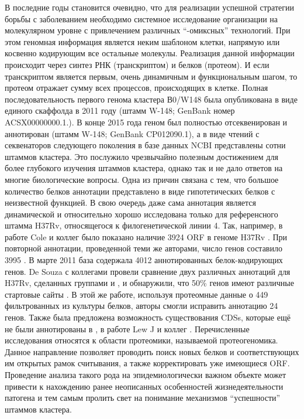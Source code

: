 В последние годы становится очевидно, что для реализации успешной стратегии борьбы с заболеванием необходимо системное исследование организации  на молекулярном уровне с привлечением различных “-омиксных” технологий. При этом геномная информация является неким шаблоном клетки, напрямую или косвенно кодирующим все остальные молекулы. Реализация данной информации происходит через синтез РНК (транскриптом) и белков (протеом). И если транскриптом является первым, очень динамичным и функциональным шагом, то протеом отражает сумму всех процессов, происходящих в клетке. Полная последовательность первого генома  кластера В0/W148 была опубликована в виде единого скаффолда в 2011 году (штамм W-148; GenBank номер ACSX00000000.1.). В конце 2015 года геном был полностью отсеквенирован и аннотирован (штамм W-148; GenBank CP012090.1), а в виде чтений с секвенаторов следующего поколения в базе данных NCBI представлены сотни штаммов кластера. Это послужило чрезвычайно полезным достижением для более глубокого изучения штаммов кластера, однако так и не дало ответов на многие биологические вопросы. Одна из причин связана с тем, что большое количество белков аннотации представлено в виде гипотетических белков с неизвестной функцией. В свою очередь даже сама аннотация является динамической и относительно хорошо исследована только для референсного штамма H37Rv, относящегося к филогенетической линии 4.  Так, например, в работе Cole и коллег было показано наличие 3924 ORF в геноме H37Rv \cite{cole1998erratum}. При повторной аннотации, проведенной теми же авторами, число генов составило 3995 \cite{camus2002re}. В марте 2011 база  содержала 4012 аннотированных белок-кодирующих генов. De Souza с коллегами провели сравнение двух различных аннотаций для H37Rv, сделанных группами  и , и обнаружили, что 50\% генов имеют различные стартовые сайты \cite{de2008high}. В этой же работе, используя протеомные данные о 449 фильтрованных из культуры белков, авторы смогли исправить аннотацию 24 генов. Также была предложена возможность существования CDSs, которые ещё не были аннотированы в , в работе Lew J и коллег \cite{lew2011tuberculist}.
Перечисленные исследования относятся к области протеомики, называемой протеогеномика. Данное направление позволяет проводить поиск новых белков и соответствующих им открытых рамок считывания, а также корректировать уже имеющиеся ORF. Проведение анализа такого рода на эпидемиологически важном объекте может привести к нахождению ранее неописанных особенностей жизнедеятельности патогена и тем самым пролить свет на понимание механизмов “успешности” штаммов кластера.

